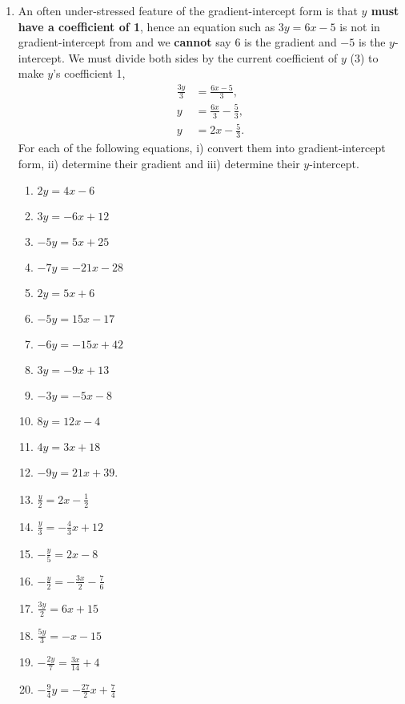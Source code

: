 \documentclass[a4paper,12pt]{article}
\begin{document}
\begin{enumerate}
\item An often under-stressed feature of the gradient-intercept
form is that \textbf{$y$ must have a coefficient of 1}, hence an equation
such as $3y = 6x - 5$ is not in gradient-intercept from and we 
\textbf{cannot} say $6$ is the gradient and $-5$ is the $y$-intercept.
We must divide both sides by the current coefficient of $y$ (3)
to make $y$'s coefficient 1,
\begin{align*}
    \frac{3y}{3} &= \frac{6x - 5}{3}, \\
    y &= \frac{6x}{3} - \frac{5}{3}, \\
    y &= 2x - \frac{5}{3}.
\end{align*}
For each of the following equations, i) convert them into 
gradient-intercept form, ii) determine their gradient and 
iii) determine their $y$-intercept.
    \begin{multicols}{2}
    \begin{enumerate}
    \item $2y = 4x - 6$
    \item $3y = -6x + 12$
    \item $-5y = 5x + 25$
    \item $-7y = -21x - 28$
    \item $2y = 5x + 6$
    \item $-5y = 15x - 17$
    \item $-6y = -15x + 42$
    \item $3y = -9x + 13$
    \item $-3y = -5x - 8$
    \item $8y = 12x - 4$
    \item $4y = 3x + 18$
    \item $-9y = 21x + 39$.
    \item $\frac{y}{2} = 2x - \frac{1}{2}$
    \item $\frac{y}{3} = -\frac{4}{3}x + 12$
    \item $-\frac{y}{5} = 2x - 8$
    \item $-\frac{y}{2} = -\frac{3x}{2} - \frac{7}{6}$
    \item $\frac{3y}{2} = 6x + 15$
    \item $\frac{5y}{3} = -x - 15$
    \item $-\frac{2y}{7} = \frac{3x}{14} + 4$
    \item $-\frac{9}{4}y = -\frac{27}{2}x + \frac{7}{4}$
    \end{enumerate}
    \end{multicols}


\end{enumerate}
\end{document}
